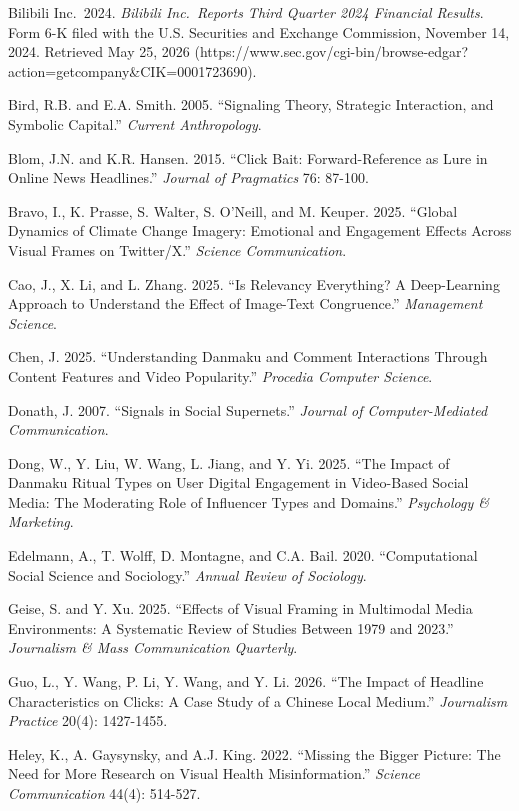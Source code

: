 \documentclass[
  fontset=none]{ctexart}
\begin{document}
Bilibili Inc.~2024. \emph{Bilibili Inc.~Reports Third Quarter 2024 Financial Results}. Form 6-K filed with the U.S. Securities and Exchange Commission, November 14, 2024. Retrieved May 25, 2026 (https://www.sec.gov/cgi-bin/browse-edgar?action=getcompany\&CIK=0001723690).

Bird, R.B. and E.A. Smith. 2005. ``Signaling Theory, Strategic Interaction, and Symbolic Capital.'' \emph{Current Anthropology}.

Blom, J.N. and K.R. Hansen. 2015. ``Click Bait: Forward-Reference as Lure in Online News Headlines.'' \emph{Journal of Pragmatics} 76: 87-100.

Bravo, I., K. Prasse, S. Walter, S. O'Neill, and M. Keuper. 2025. ``Global Dynamics of Climate Change Imagery: Emotional and Engagement Effects Across Visual Frames on Twitter/X.'' \emph{Science Communication}.

Cao, J., X. Li, and L. Zhang. 2025. ``Is Relevancy Everything? A Deep-Learning Approach to Understand the Effect of Image-Text Congruence.'' \emph{Management Science}.

Chen, J. 2025. ``Understanding Danmaku and Comment Interactions Through Content Features and Video Popularity.'' \emph{Procedia Computer Science}.

Donath, J. 2007. ``Signals in Social Supernets.'' \emph{Journal of Computer-Mediated Communication}.

Dong, W., Y. Liu, W. Wang, L. Jiang, and Y. Yi. 2025. ``The Impact of Danmaku Ritual Types on User Digital Engagement in Video-Based Social Media: The Moderating Role of Influencer Types and Domains.'' \emph{Psychology \& Marketing}.

Edelmann, A., T. Wolff, D. Montagne, and C.A. Bail. 2020. ``Computational Social Science and Sociology.'' \emph{Annual Review of Sociology}.

Geise, S. and Y. Xu. 2025. ``Effects of Visual Framing in Multimodal Media Environments: A Systematic Review of Studies Between 1979 and 2023.'' \emph{Journalism \& Mass Communication Quarterly}.

Guo, L., Y. Wang, P. Li, Y. Wang, and Y. Li. 2026. ``The Impact of Headline Characteristics on Clicks: A Case Study of a Chinese Local Medium.'' \emph{Journalism Practice} 20(4): 1427-1455.

Heley, K., A. Gaysynsky, and A.J. King. 2022. ``Missing the Bigger Picture: The Need for More Research on Visual Health Misinformation.'' \emph{Science Communication} 44(4): 514-527.
\end{document}
